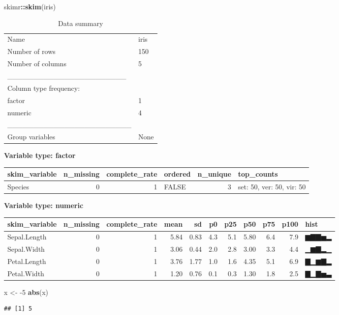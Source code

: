\documentclass[]{article}
\newenvironment{Shaded}{\begin{snugshade}}{\end{snugshade}}
\newcommand{\DecValTok}[1]{\textcolor[rgb]{0.00,0.00,0.81}{#1}}
\newcommand{\KeywordTok}[1]{\textcolor[rgb]{0.13,0.29,0.53}{\textbf{#1}}}
\newcommand{\NormalTok}[1]{#1}
\newcommand{\OperatorTok}[1]{\textcolor[rgb]{0.81,0.36,0.00}{\textbf{#1}}}
\newcommand{\StringTok}[1]{\textcolor[rgb]{0.31,0.60,0.02}{#1}}
\begin{document}
\begin{Shaded}
\begin{Highlighting}[]
\NormalTok{skimr}\OperatorTok{::}\KeywordTok{skim}\NormalTok{(iris)}
\end{Highlighting}
\end{Shaded}

\begin{longtable}[]{@{}ll@{}}
\caption{Data summary}\tabularnewline
\toprule
\endhead
Name & iris\tabularnewline
Number of rows & 150\tabularnewline
Number of columns & 5\tabularnewline
\_\_\_\_\_\_\_\_\_\_\_\_\_\_\_\_\_\_\_\_\_\_\_ &\tabularnewline
Column type frequency: &\tabularnewline
factor & 1\tabularnewline
numeric & 4\tabularnewline
\_\_\_\_\_\_\_\_\_\_\_\_\_\_\_\_\_\_\_\_\_\_\_\_ &\tabularnewline
Group variables & None\tabularnewline
\bottomrule
\end{longtable}

\textbf{Variable type: factor}

\begin{longtable}[]{@{}lrrlrl@{}}
\toprule
skim\_variable & n\_missing & complete\_rate & ordered & n\_unique &
top\_counts\tabularnewline
\midrule
\endhead
Species & 0 & 1 & FALSE & 3 & set: 50, ver: 50, vir: 50\tabularnewline
\bottomrule
\end{longtable}

\textbf{Variable type: numeric}

\begin{longtable}[]{@{}lrrrrrrrrrl@{}}
\toprule
skim\_variable & n\_missing & complete\_rate & mean & sd & p0 & p25 &
p50 & p75 & p100 & hist\tabularnewline
\midrule
\endhead
Sepal.Length & 0 & 1 & 5.84 & 0.83 & 4.3 & 5.1 & 5.80 & 6.4 & 7.9 &
▆▇▇▅▂\tabularnewline
Sepal.Width & 0 & 1 & 3.06 & 0.44 & 2.0 & 2.8 & 3.00 & 3.3 & 4.4 &
▁▆▇▂▁\tabularnewline
Petal.Length & 0 & 1 & 3.76 & 1.77 & 1.0 & 1.6 & 4.35 & 5.1 & 6.9 &
▇▁▆▇▂\tabularnewline
Petal.Width & 0 & 1 & 1.20 & 0.76 & 0.1 & 0.3 & 1.30 & 1.8 & 2.5 &
▇▁▇▅▃\tabularnewline
\bottomrule
\end{longtable}

\begin{Shaded}
\begin{Highlighting}[]
\NormalTok{x <-}\StringTok{ }\DecValTok{-5}
\KeywordTok{abs}\NormalTok{(x)}
\end{Highlighting}
\end{Shaded}

\begin{verbatim}
## [1] 5
\end{verbatim}
\end{document}
